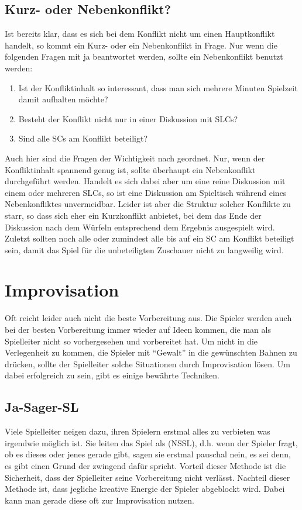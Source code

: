 \subsection{Kurz- oder Nebenkonflikt?}
Ist bereits klar, dass es sich bei dem Konflikt nicht um einen Hauptkonflikt handelt, so kommt ein Kurz- oder ein Nebenkonflikt in Frage. Nur wenn die folgenden Fragen mit ja beantwortet werden, sollte ein Nebenkonflikt benutzt werden:
\begin{enumerate}
	\item Ist der Konfliktinhalt so interessant, dass man sich mehrere Minuten Spielzeit damit aufhalten möchte?
	\item Besteht der Konflikt nicht nur in einer Diskussion mit SLCs?
	\item Sind alle SCs am Konflikt beteiligt?
\end{enumerate}
Auch hier sind die Fragen der Wichtigkeit nach geordnet. Nur, wenn der Konfliktinhalt spannend genug ist, sollte überhaupt ein Nebenkonflikt durchgeführt werden. Handelt es sich dabei aber um eine reine Diskussion mit einem oder mehreren SLCs, so ist eine Diskussion am Spieltisch während eines Nebenkonfliktes unvermeidbar. Leider ist aber die Struktur solcher Konflikte zu starr, so dass sich eher ein Kurzkonflikt anbietet, bei dem das Ende der Diskussion nach dem Würfeln entsprechend dem Ergebnis ausgespielt wird. Zuletzt sollten noch alle oder zumindest alle bis auf ein SC am Konflikt beteiligt sein, damit das Spiel für die unbeteiligten Zuschauer nicht zu langweilig wird.









\section{Improvisation}

Oft reicht leider auch nicht die beste Vorbereitung aus. Die Spieler werden
auch bei der besten Vorbereitung immer wieder auf Ideen kommen, die man als
Spielleiter nicht so vorhergesehen und vorbereitet hat. Um nicht in die
Verlegenheit zu kommen, die Spieler mit ``Gewalt'' in die gewünschten Bahnen zu
drücken, sollte der Spielleiter solche Situationen durch Improvisation 
lösen. Um dabei erfolgreich zu sein, gibt es einige bewährte Techniken.

\subsection{Ja-Sager-SL}
Viele Spielleiter neigen dazu, ihren Spielern erstmal alles zu verbieten was
irgendwie möglich ist. Sie leiten das Spiel als 
(NSSL), d.h. wenn der Spieler fragt, ob es dieses oder jenes gerade gibt, sagen sie erstmal
pauschal nein, es sei denn, es gibt einen Grund der zwingend dafür spricht.
Vorteil dieser Methode ist die Sicherheit, dass der Spielleiter seine
Vorbereitung nicht verlässt. Nachteil dieser Methode ist, dass jegliche
kreative Energie der Spieler abgeblockt wird. Dabei kann man gerade diese oft
zur Improvisation nutzen.

